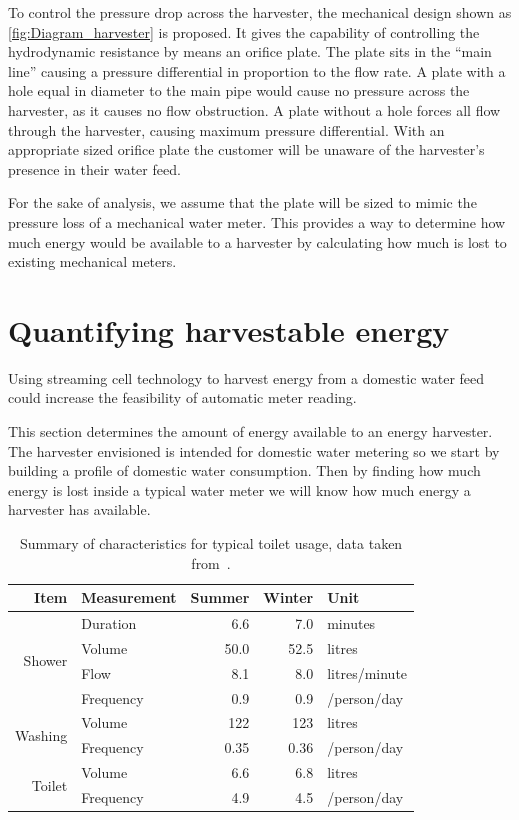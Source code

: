     To control the pressure drop across the harvester, the mechanical design shown as \cref{fig:Diagram_harvester} is proposed.
    It gives the capability of controlling the hydrodynamic resistance by means an orifice plate.
    The plate sits in the ``main line'' causing a pressure differential in proportion to the flow rate.
    A plate with a hole equal in diameter to the main pipe would cause no pressure across the harvester, as it causes no flow obstruction.
    A plate without a hole forces all flow through the harvester, causing maximum pressure differential.
    With an appropriate sized orifice plate the customer will be unaware of the harvester's presence in their water feed.
    
    For the sake of analysis, we assume that the plate will be sized to mimic the pressure loss of a mechanical water meter.
    This provides a way to determine how much energy would be available to a harvester by calculating how much is lost to existing mechanical meters.


  \section{Quantifying harvestable energy}

    Using streaming cell technology to harvest energy from a domestic water feed could increase the feasibility of automatic meter reading.

    This section determines the amount of energy available to an energy harvester.
    The harvester envisioned is intended for domestic water metering so we start by building a profile of domestic water consumption.
    Then by finding how much energy is lost inside a typical water meter we will know how much energy a harvester has available.

    \begin{table}
      \centering
      \begin{tabular}{r l|r|r|l}
        Item & Measurement & Summer & Winter & Unit\\
        \hline\hline
        \multirow{4}{*}{Shower} & Duration & 6.6 & 7.0 & minutes\\
                                & Volume & 50.0 & 52.5 & litres\\
                                & Flow & 8.1 & 8.0 & litres/minute\\
                                & Frequency & 0.9 & 0.9 & /person/day\\
        \hline
        \multirow{2}{*}{Washing}& Volume & 122 & 123 & litres\\
                                & Frequency & 0.35 & 0.36 & /person/day\\
        \hline
        \multirow{2}{*}{Toilet} & Volume & 6.6 & 6.8 & litres\\
                                & Frequency & 4.9 & 4.5 & /person/day\\
      \end{tabular}
      \caption{\label{tab:consumption_figures}Summary of characteristics for typical toilet usage, data taken from~\cite{Heinrich2008}.}
    \end{table}

